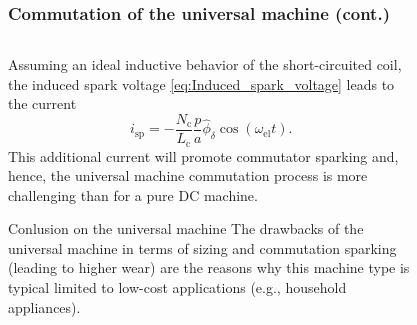 \begin{frame}
	\frametitle{Commutation of the universal machine (cont.)}
	\begin{columns}
		\begin{column}{0.65\textwidth}
		Assuming an ideal inductive behavior of the short-circuited coil, the induced spark voltage \eqref{eq:Induced_spark_voltage} leads to the current
		\begin{equation}
			i_\mathrm{sp} = -\frac{N_\mathrm{c} }{L_\mathrm{c} } \frac{p}{a} \hat{\phi}_\delta \cos(\omega_\mathrm{el} t).
		\end{equation}
		\pause
		This additional current will promote commutator sparking and, hence, the universal machine commutation process is more challenging than for a pure DC machine. 
		\pause
		\vspace{-0.2cm}
		\begin{varblock}{Conlusion on the universal machine}
			The drawbacks of the universal machine in terms of sizing and commutation sparking (leading to higher wear) are the reasons why this machine type is typical limited to low-cost applications (e.g., household appliances). 
		\end{varblock}
\end{column}
\hfill
\begin{column}{0.35\textwidth}
	\onslide<1->
	\begin{figure}
		\centering
		\includegraphics[scale=1]{fig/lec03/Commutation_universal_machine.pdf}
\end{figure}
\end{column}
\end{columns}
\end{frame}